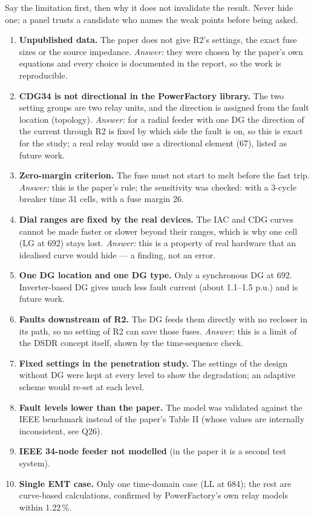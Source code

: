 \documentclass[11pt,a4paper]{article}
\newcommand{\sect}[1]{\bigskip{\Large\color{navy}\bfseries #1}\par\smallskip{\color{navy}\hrule height 0.8pt}\smallskip}
\begin{document}
\sect{2. Limitations (and how to present them)}
Say the limitation first, then why it does not invalidate the result. Never hide one; a panel trusts a
candidate who names the weak points before being asked.
\begin{enumerate}[leftmargin=*,itemsep=3pt]
\item \textbf{Unpublished data.} The paper does not give R2's settings, the exact fuse sizes or the source
  impedance. \emph{Answer:} they were chosen by the paper's own equations and every choice is documented in the
  report, so the work is reproducible.
\item \textbf{CDG34 is not directional in the PowerFactory library.} The two setting groups are two relay units,
  and the direction is assigned from the fault location (topology). \emph{Answer:} for a radial feeder with one DG
  the direction of the current through R2 is fixed by which side the fault is on, so this is exact for the
  study; a real relay would use a directional element (67), listed as future work.
\item \textbf{Zero-margin criterion.} The fuse must not start to melt before the fast trip. \emph{Answer:} this is
  the paper's rule; the sensitivity was checked: with a 3-cycle breaker time 31 cells, with a fuse margin 26.
\item \textbf{Dial ranges are fixed by the real devices.} The IAC and CDG curves cannot be made faster or slower
  beyond their ranges, which is why one cell (LG at 692) stays lost. \emph{Answer:} this is a property of real
  hardware that an idealised curve would hide --- a finding, not an error.
\item \textbf{One DG location and one DG type.} Only a synchronous DG at 692. Inverter-based DG gives much
  less fault current (about 1.1--1.5 p.u.) and is future work.
\item \textbf{Faults downstream of R2.} The DG feeds them directly with no recloser in its path, so no setting of
  R2 can save those fuses. \emph{Answer:} this is a limit of the DSDR concept itself, shown by the time-sequence check.
\item \textbf{Fixed settings in the penetration study.} The settings of the design without DG were kept at every
  level to show the degradation; an adaptive scheme would re-set at each level.
\item \textbf{Fault levels lower than the paper.} The model was validated against the IEEE benchmark instead
  of the paper's Table II (whose values are internally inconsistent, see Q26).
\item \textbf{IEEE 34-node feeder not modelled} (in the paper it is a second test system).
\item \textbf{Single EMT case.} Only one time-domain case (LL at 684); the rest are curve-based calculations,
  confirmed by PowerFactory's own relay models within 1.22\,\%.
\end{enumerate}
\end{document}
